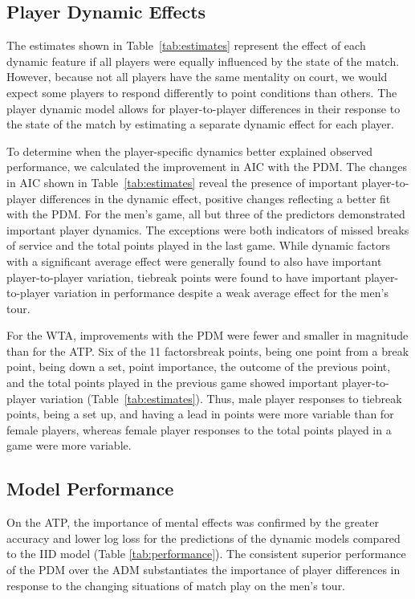 \documentclass{Latex/svjour3}
\begin{document}
\subsection{Player Dynamic Effects}


The estimates shown in Table~\ref{tab:estimates} represent the effect of each
dynamic feature if all players were equally influenced by the state of the
match. However, because not all players have the same mentality on court, we
would expect some players to respond differently to point conditions than
others. The player dynamic model allows for player-to-player differences in
their response to the state of the match by estimating a separate dynamic effect
for each player.

To determine when the player-specific dynamics better explained observed
performance, we calculated the improvement in AIC with the PDM. The changes in
AIC shown in Table~\ref{tab:estimates} reveal the presence of important
player-to-player differences in the dynamic effect, positive changes reflecting
a better fit with the PDM. For the men's game, all but three of the predictors
demonstrated important player dynamics. The exceptions were both indicators of
missed breaks of service and the total points played in the last game. While
dynamic factors with a significant average effect were generally found to also
have important player-to-player variation, tiebreak points were found to have
important player-to-player variation in performance despite a weak average
effect for the men's tour.

For the WTA, improvements with the PDM were fewer and smaller in magnitude than
for the ATP. Six of the 11 factors\textemdash break points, being one point from
a break point, being down a set, point importance, the outcome of the previous
point, and the total points played in the previous game \textemdash showed
important player-to-player variation (Table~\ref{tab:estimates}). Thus, male
player responses to tiebreak points, being a set up, and having a lead in points
were more variable than for female players, whereas female player responses to
the total points played in a game were more variable.

\subsection{Model Performance}

On the ATP, the importance of mental effects was confirmed by the greater
accuracy and lower log loss for the predictions of the dynamic models compared
to the IID model (Table \ref{tab:performance}). The consistent superior
performance of the PDM over the ADM substantiates the importance of player
differences in response to the changing situations of match play on the men's
tour.
\end{document}
